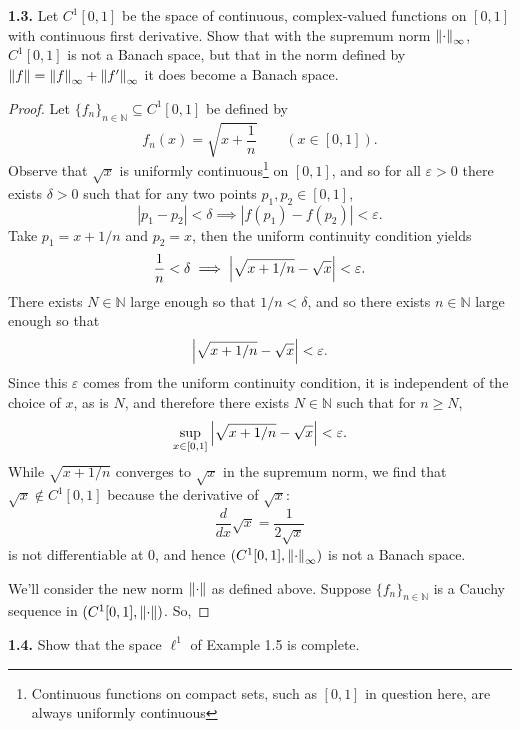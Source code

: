 \documentclass[12pt]{article}
\theoremstyle{definition}
\begin{document}
	\noindent \textbf{1.3.} Let $C^1[0, 1]$ be the space of continuous, complex-valued functions on $[0, 1]$ with continuous first derivative. Show that with the supremum norm $\norm{\cdot}_\infty$, $C^1[0, 1]$ is not a Banach space, but that in the norm defined by $\norm{f} = \norm{f}_\infty + \norm{f'}_\infty$ it does become a Banach space. 
		\begin{proof}
			Let $\{f_n\}_{n \in \mathbb{N}} \subseteq C^1[0, 1]$ be defined by $$f_n(x) = \sqrt{x + \frac{1}{n}} \qquad (x \in [0, 1]).$$ Observe that $\sqrt{x}$ is uniformly continuous\footnote{Continuous functions on compact sets, such as $[0, 1]$ in question here, are always uniformly continuous} on $[0, 1]$, and so for all $\varepsilon > 0$ there exists $\delta > 0$ such that for any two points $p_1, p_2 \in [0, 1]$, $$|p_1 - p_2| < \delta \implies |f(p_1) - f(p_2)| < \varepsilon.$$  Take $p_1 = x + 1/n$ and $p_2 = x$, then the uniform continuity condition yields $$\frac{1}{n} < \delta \implies \abs{\sqrt{x + 1/n} - \sqrt{x}} < \varepsilon.$$ There exists $N \in \mathbb{N}$ large enough so that $1/n < \delta$, and so there exists $n \in \mathbb{N}$ large enough so that $$\abs{\sqrt{x + 1/n} - \sqrt{x}} < \varepsilon.$$ Since this $\varepsilon$ comes from the uniform continuity condition, it is independent of the choice of $x$, as is $N$, and therefore there exists $N \in \mathbb{N}$ such that for $n \geq N$, $$\sup_{x \in [0, 1]} \abs{\sqrt{x + 1/n} - \sqrt{x}} < \varepsilon.$$ While $\sqrt{x + 1/n}$ converges to $\sqrt{x}$ in the supremum norm, we find that $\sqrt{x} \notin C^1[0, 1]$ because the derivative of $\sqrt{x}$: $$\frac{d}{dx} \sqrt{x} = \frac{1}{2 \sqrt{x}}$$ is not differentiable at 0, and hence $(C^1[0, 1], \norm{\cdot}_\infty)$ is not a Banach space. 
			
			
			
			We'll consider the new norm $\norm{\cdot}$ as defined above. Suppose $\{f_n\}_{n \in \mathbb{N}}$ is a Cauchy sequence in $(C^1[0, 1], \norm{\cdot})$. So,  
		\end{proof}
	
	\noindent \textbf{1.4.} Show that the space $\ell^1$ of Example 1.5 is complete. 
\end{document}
